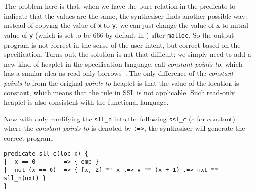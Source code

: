 The problem here is that, when we have the pure relation in the
predicate to indicate that the values are the same, the synthesiser
finds another possible way: instead of copying the value of
\lstinline{x} to \lstinline{y}, we can just change the value of x to
initial value of \lstinline|y| (which is set  to be 666 by default in \suslik) after \lstinline[language = c]{malloc}.
So the output program is not correct in the sense of the user intent, but correct based on the specification.
%
Turns out, the solution is not that difficult: we simply need to add a
new kind of heaplet in the specification language, call
\textit{constant points-to}, which has a similar idea as read-only
borrows~\cite{costea2020concise}.
%
%
The only difference of the \textit{constant points-to} from the original
\textit{points-to} heaplet is that the value of the location is
constant, which means that the \writer rule in SSL is not applicable.
Such read-only heaplet is also consistent with the functional language.

Now with only modifying the \lstinline|sll_n| into the following \lstinline|ssl_c| (c for constant) where the \textit{constant points-to} is denoted by \lstinline|:=>|, the synthesiser will generate the correct program.
\begin{lstlisting}[language=SynLang]
predicate sll_c(loc x) {
|  x == 0        => { emp }
|  not (x == 0)  => { [x, 2] ** x :=> v ** (x + 1) :=> nxt ** sll_n(nxt) }
}
\end{lstlisting}




